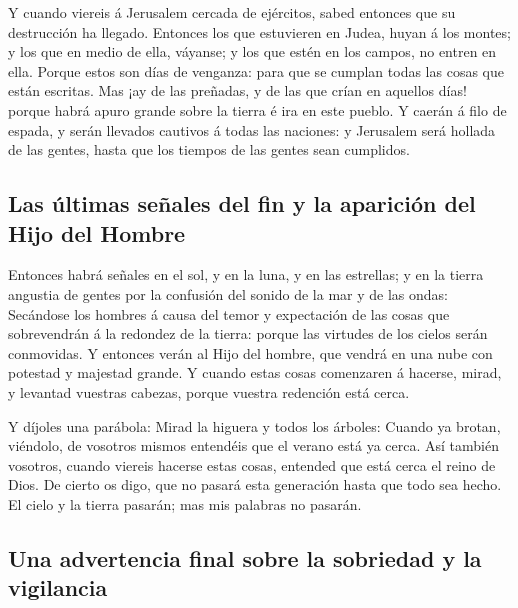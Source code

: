  Y cuando viereis á Jerusalem cercada de ejércitos, sabed
entonces que su destrucción ha llegado.  Entonces los que
estuvieren en Judea, huyan á los montes; y los que en medio de ella,
váyanse; y los que estén en los campos, no entren en ella.
 Porque estos son días de venganza: para que se cumplan
todas las cosas que están escritas.  Mas ¡ay de las
preñadas, y de las que crían en aquellos días! porque habrá apuro grande
sobre la tierra é ira en este pueblo.  Y caerán á filo de
espada, y serán llevados cautivos á todas las naciones: y Jerusalem será
hollada de las gentes, hasta que los tiempos de las gentes sean
cumplidos.

\hypertarget{las-uxfaltimas-seuxf1ales-del-fin-y-la-apariciuxf3n-del-hijo-del-hombre}{%
\subsection{Las últimas señales del fin y la aparición del Hijo del
Hombre}\label{las-uxfaltimas-seuxf1ales-del-fin-y-la-apariciuxf3n-del-hijo-del-hombre}}

 Entonces habrá señales en el sol, y en la luna, y en las
estrellas; y en la tierra angustia de gentes por la confusión del sonido
de la mar y de las ondas:  Secándose los hombres á causa
del temor y expectación de las cosas que sobrevendrán á la redondez de
la tierra: porque las virtudes de los cielos serán conmovidas.
 Y entonces verán al Hijo del hombre, que vendrá en una
nube con potestad y majestad grande.  Y cuando estas
cosas comenzaren á hacerse, mirad, y levantad vuestras cabezas, porque
vuestra redención está cerca.

 Y díjoles una parábola: Mirad la higuera y todos los
árboles:  Cuando ya brotan, viéndolo, de vosotros mismos
entendéis que el verano está ya cerca.  Así también
vosotros, cuando viereis hacerse estas cosas, entended que está cerca el
reino de Dios.  De cierto os digo, que no pasará esta
generación hasta que todo sea hecho.  El cielo y la
tierra pasarán; mas mis palabras no pasarán.

\hypertarget{una-advertencia-final-sobre-la-sobriedad-y-la-vigilancia}{%
\subsection{Una advertencia final sobre la sobriedad y la
vigilancia}\label{una-advertencia-final-sobre-la-sobriedad-y-la-vigilancia}}

